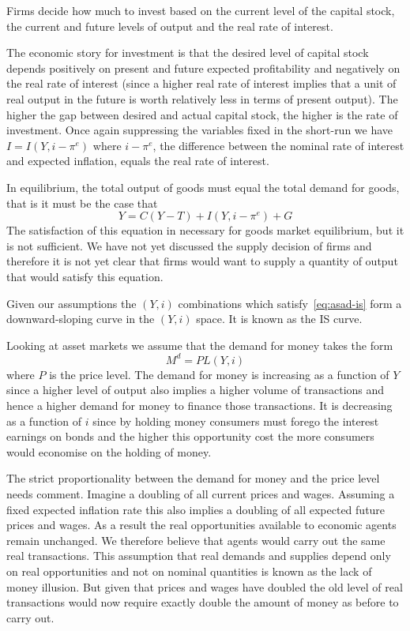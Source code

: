 \documentclass[11pt,reqno,openany]{amsbook}
\begin{document}
Firms decide how much to invest based on the current
level of the capital stock, the current and future levels of
output and the real rate of interest. 

The economic story for investment is that the desired level
of capital stock depends positively on present and future
expected profitability and negatively on the real rate of
interest (since a higher real rate of interest implies that
a unit of real output in the future is worth relatively less
in terms of present output). The higher the gap between
desired and actual capital stock, the higher is the rate of
investment.  Once again suppressing the variables fixed in
the short-run we have $I=I(Y,i-\pi^e)$ where $i-\pi^e$, the
difference between the nominal rate of interest and expected
inflation, equals the real rate of interest.

In equilibrium, the total output of goods must equal the
total demand for goods, that is it must be the case that 
\begin{equation}
  \label{eq:asad-is}
  Y = C(Y-T)+I(Y,i-\pi^e)+G
\end{equation}
The satisfaction of this equation in necessary for goods
market equilibrium, but it is not sufficient. We have not
yet discussed the supply decision of firms and therefore it
is not yet clear that firms would want to supply a quantity
of output that would satisfy this equation. 

Given our assumptions the $(Y,i)$ combinations which
satisfy~\eqref{eq:asad-is} form a downward-sloping curve in
the $(Y,i)$ space. It is known as the IS curve.

Looking at asset markets we assume that the demand for money
takes the form
\[M^d = PL(Y,i)\]
where $P$ is the price level. The demand for money is
increasing as a function of $Y$ since a higher level of
output also implies a higher volume of transactions and
hence a higher demand for money to finance those
transactions. It is decreasing as a function of $i$ since by
holding money consumers must forego the interest earnings on
bonds and the higher this opportunity cost the more consumers
would economise on the holding of money.

The strict proportionality between the demand for money and
the price level needs comment. Imagine a doubling of all
current prices and wages. Assuming a fixed expected
inflation rate this also implies a doubling of all expected
future prices and wages. As a result the real opportunities
available to economic agents remain unchanged. We therefore
believe that agents would carry out the same real
transactions. This assumption that real demands and supplies
depend only on real opportunities and not on nominal
quantities is known as the lack of money illusion. But
given that prices and wages have doubled the old level of real
transactions would now require exactly double the amount of
money as before to carry out.
\end{document}
